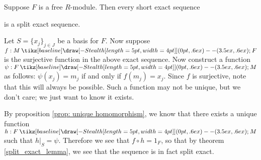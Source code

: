 \documentclass[12pt,letterpaper]{algebra_book}
\renewcommand{\to}{\mathbin{\tikz[baseline] \draw[-{Stealth[length=5pt,width=4pt]}] (0pt,.6ex) -- (3.5ex,.6ex);}}
\theoremstyle{definition}
\begin{document}
\begin{proposition}
    Suppose $F$ is a free $R$-module. Then every short exact
    sequence 
    \begin{center}
    \end{center}
    is a split exact sequence. 
\end{proposition}

\begin{prf}
    Let $S = \{x_j\}_{j \in J}$ be a basis for $F$. Now suppose $f: M \to F$ is the
    surjective function in the above exact sequence. Now construct
    a function $\psi: F \to M$ as follows: $\psi(x_j) = m_j$ if
    and only if $f(m_j) = x_j$. Since $f$ is surjective, note that
    this will always be possible. Such a function may not be
    unique, but we don't care; we just want to know it exists. 

    By proposition \ref{prop: unique homomorphism}, we know that
    there exists a unique function $h: F \to M$ such that $h|_S =
    \psi$. Therefore we see that $f \circ h = 1_F$, so that by
    theorem \ref{split_exact_lemma}, we see that the sequence is
    in fact split exact. 
\end{prf}
\end{document}

